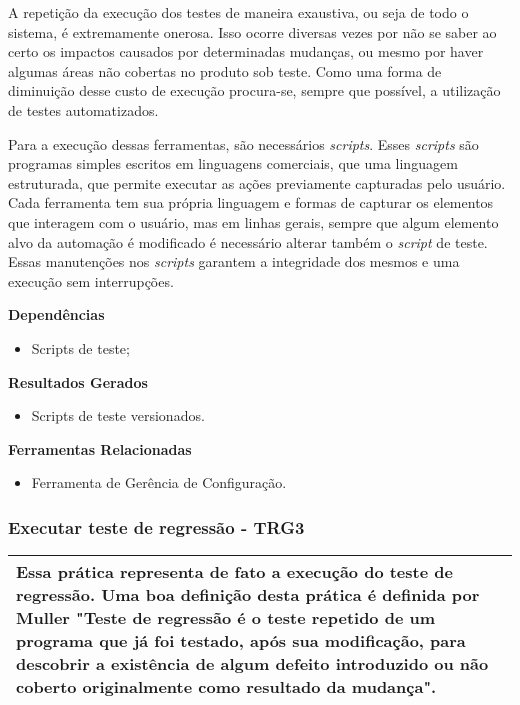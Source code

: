 A repetição da execução dos testes de maneira exaustiva, ou seja de todo o sistema, é extremamente onerosa. Isso ocorre diversas vezes por não se saber ao certo os impactos causados por determinadas mudanças, ou mesmo por haver algumas áreas não cobertas no produto sob teste. Como uma forma de diminuição desse custo de execução procura-se, sempre que possível, a utilização de testes automatizados. 

Para a execução dessas ferramentas, são necessários \textit{scripts}. Esses \textit{scripts} são programas simples escritos em linguagens comerciais, que uma linguagem estruturada, que permite executar as ações previamente capturadas pelo usuário. Cada ferramenta tem sua própria linguagem e formas de capturar os elementos que interagem com o usuário, mas em linhas gerais, sempre que algum elemento alvo da automação é modificado é necessário alterar também o \textit{script} de teste. Essas manutenções nos \textit{scripts} garantem a integridade dos mesmos e uma execução sem interrupções.

\textbf{Dependências}
\begin{itemize}
    \item Scripts de teste;
\end{itemize}

\textbf{Resultados Gerados}
\begin{itemize}
    \item Scripts de teste versionados.
\end{itemize}

\textbf{Ferramentas Relacionadas}
\begin{itemize}
    \item Ferramenta de Gerência de Configuração.
\end{itemize}

\subsubsection{Executar teste de regressão - TRG3}
\label{sec:trg3}

\begin{table}[H]
\centering
\begin{tabular}{|p{130mm}|}
\hline
Essa prática representa de fato a execução do teste de regressão. Uma boa definição desta prática é definida por Muller \cite{muller2011} "Teste de regressão é o teste repetido de um programa que já foi testado, após sua modificação, para descobrir a existência de algum defeito introduzido ou não coberto originalmente como resultado da mudança".  \\
\hline
\end{tabular}
\end{table}

